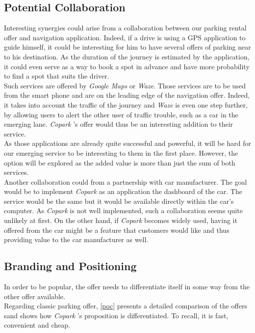 \documentclass[12pt,a4paper,oneside]{book}
\newcommand{\bp}{\textit{Copark }}
\begin{document}
\subsection{Potential Collaboration}
Interesting synergies could arise from a collaboration between our parking rental offer and navigation application. Indeed, if a drive is using a GPS application to guide himself, it could be interesting for him to have several offers of parking near to his destination. As the duration of the journey is estimated by the application, it could even serve as a way to book a spot in advance and have more probability to find a spot that suits the driver.\\
Such services are offered by \textit{Google Maps} or \textit{Waze}. Those services are to be used from the smart phone and are on the leading edge of the navigation offer. Indeed, it takes into account the traffic of the journey and \textit{Waze} is even one step further, by allowing users to alert the other user of traffic trouble, such as a car in the emerging lane. \bp's offer would thus be an interesting addition to their service.\\
As those applications are already quite successful and powerful, it will be hard for our emerging service to be interesting to them in the first place. However, the option will be explored as the added value is more than just the sum of both services.\\

Another collaboration could from a partnership with car manufacturer. The goal would be to implement \bp as an application the dashboard of the car. The service would be the same but it would be available directly within the car's computer. As \bp is not well implemented, such a collaboration seems quite unlikely at first. On the other hand, if \bp becomes widely used, having it offered from the car might be a feature that customers would like and thus providing value to the car manufacturer as well.

\subsection{Branding and Positioning}

In order to be popular, the offer needs to differentiate itself in some way from the other offer available.\\

Regarding classic parking offer, \autoref{poc} presents a detailed comparison of the offers sand shows how \bp's proposition is differentiated. To recall, it is fast, convenient and cheap.\\
\end{document}
